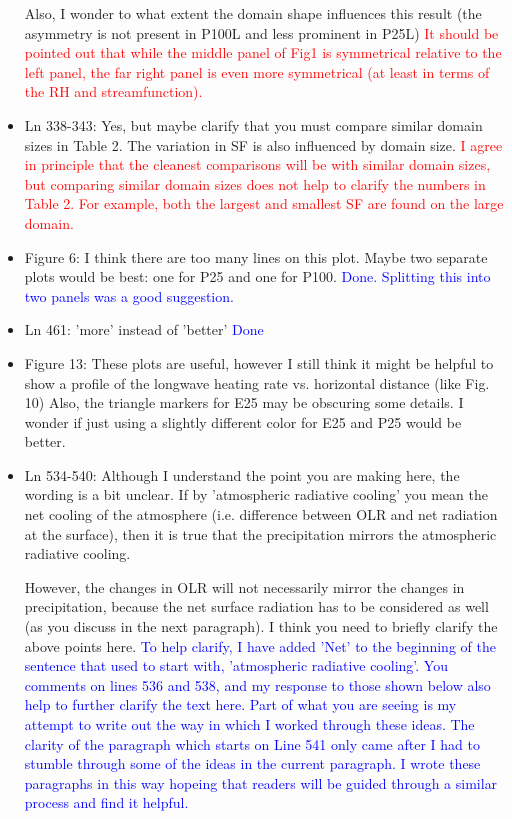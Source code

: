 \documentclass[draft]{agujournal2019}
\begin{document}
\begin{itemize}
Also, I wonder to what extent the domain shape influences 
  this result 
  (the asymmetry is not present in P100L and less prominent in P25L)
  \textcolor{red}{It should be pointed out that while the middle panel of Fig1 is symmetrical relative to the left panel, 
  the far right panel is even more symmetrical (at least in terms of the RH and streamfunction).}
  
  \item Ln 338-343: Yes, but maybe clarify that you must compare similar domain sizes in Table 2. The variation in SF is also influenced by domain size. 
  \textcolor{red}{I agree in principle that the cleanest comparisons will be with similar domain sizes, but comparing similar domain sizes does not help to clarify the numbers in Table 2.  For example, both the largest and smallest SF are found on the large domain.  }
  
  \item Figure 6: I think there are too many lines on this plot. Maybe two separate plots would be best: one for P25 and one for P100.
  \textcolor{blue}{Done.  Splitting this into two panels was a good suggestion.}
  
  \item Ln 461: 'more' instead of 'better'
  \textcolor{blue}{Done}
  
  \item Figure 13: These plots are useful, however I still think it might be helpful to show a profile of the longwave heating rate vs. horizontal distance (like Fig. 10)
%
Also, the triangle markers for E25 may be obscuring some details. 
I wonder if just using a slightly different color for E25 and P25 would be better.
  
  \item Ln 534-540: Although I understand the point you are making here, the wording is a bit unclear. If by 'atmospheric radiative cooling' you mean the net cooling of the atmosphere (i.e. difference between OLR and net radiation at the surface), then it is true that the precipitation mirrors the atmospheric radiative cooling.  
  
However, the changes in OLR will not necessarily mirror the changes in precipitation, because the net surface radiation has to be considered as well (as you discuss in the next paragraph). 
%
I think you need to briefly clarify the above points here.
  \textcolor{blue}{To help clarify, I have added 'Net' to the beginning of the sentence that used to start with, 'atmospheric radiative cooling'.  You comments on lines 536 and 538, and my response to those shown below also help to further clarify the text here.
  Part of what you are seeing is my attempt to write out the way in which I worked through these ideas.  The clarity of the paragraph which starts on Line 541 only came after I had to stumble through some of the ideas in the current paragraph.  I 
  wrote these paragraphs in this way  
  hopeing that readers will be guided through a similar process and find it helpful.}
  

\end{itemize}
\end{document}
